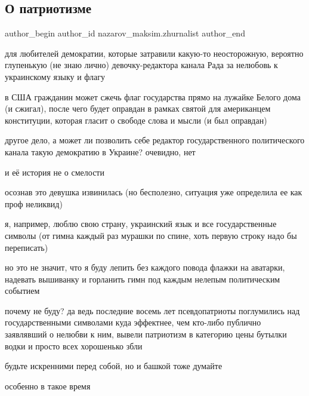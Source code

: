  
 
 
 
 
 
\subsection{О патриотизме}
\label{sec:30_01_2022.fb.nazarov_maksim.zhurnalist.1.o_patriotizme}
 
\ifcmt
 author_begin
   author_id nazarov_maksim.zhurnalist
 author_end
\fi

для любителей демократии, которые затравили какую-то неосторожную, вероятно
глупенькую (не знаю лично) девочку-редактора канала Рада за нелюбовь к
украинскому языку и флагу

в США гражданин может сжечь флаг государства прямо на лужайке Белого дома (и
сжигал), после чего будет оправдан в рамках святой для американцем конституции,
которая гласит о свободе слова и мысли (и был оправдан) 

другое дело, а может ли позволить себе редактор государственного политического
канала такую демократию в Украине? очевидно, нет

и её история не о смелости  

осознав это девушка извинилась (но бесполезно, ситуация уже определила ее как
проф неликвид) 

я, например, люблю свою страну, украинский язык и все государственные символы
(от гимна каждый раз мурашки по спине, хоть первую строку надо бы переписать) 

но это не значит, что я буду лепить без каждого повода флажки на аватарки,
надевать вышиванку и горланить гимн под каждым нелепым политическим событием

почему не буду? да ведь последние восемь лет псевдопатриоты поглумились над
государственными символами куда эффектнее, чем кто-либо публично заявлявший о
нелюбви к ним, вывели патриотизм в категорию цены бутылки водки и просто всех
хорошенько збли

будьте искренними перед собой, но и башкой тоже думайте 

особенно в такое время
